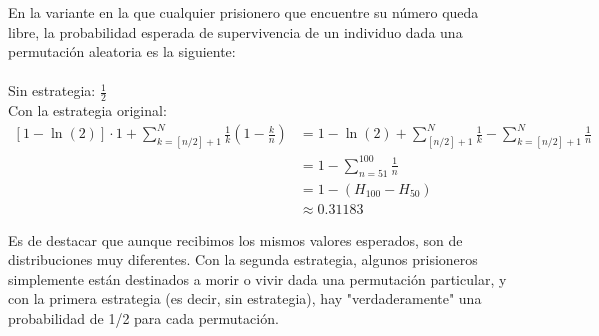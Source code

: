 En la variante en la que cualquier prisionero que encuentre su número queda libre, la probabilidad esperada de supervivencia de un individuo dada una permutación aleatoria es la siguiente:
\\\\
Sin estrategia: $\frac{1}{2}$\\
Con la estrategia original:
\begin{equation}
    \begin{split}
        [1-\ln(2)]\cdot 1+\sum_{k=[n/2]+1}^{N} \frac{1}{k}\left(1-\frac{k}{n}\right)&=1-\ln(2)+\sum_{[n/2]+1}^{N}\frac{1}{k}-\sum_{k=[n/2]+1}^{N}\frac{1}{n} \\
        &=1-\sum_{n=51}^{100} \frac{1}{n} \\
        &=1-(H_{100}-H_{50}) \\
        &\approx 0.31183
    \end{split}
\end{equation}

Es de destacar que aunque recibimos los mismos valores esperados, son de distribuciones muy diferentes. Con la segunda estrategia, algunos prisioneros simplemente están destinados a morir o vivir dada una permutación particular, y con la primera estrategia (es decir, sin estrategia), hay "verdaderamente" una probabilidad de 1/2 para cada permutación.